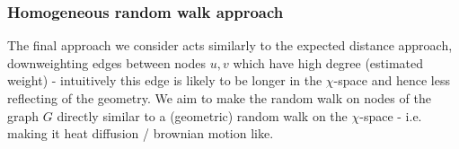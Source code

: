 


\subsubsection{Homogeneous random walk approach}
The final approach we consider acts similarly to the expected distance approach, downweighting edges between nodes $u, v$ which have high degree (estimated weight) - intuitively this edge is likely to be longer in the $\chi$-space and hence less reflecting of the geometry. We aim to make the random walk on nodes of the graph $G$ directly similar to a (geometric) random walk on the $\chi$-space - i.e. making it heat diffusion / brownian motion like.

